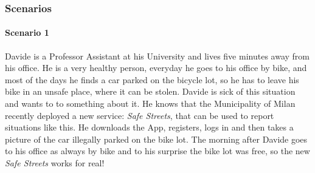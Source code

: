 \subsubsection{Scenarios}


\paragraph{Scenario 1}
Davide is a Professor Assistant at his University and lives five minutes away
from his office. He is a very healthy person, everyday he goes to his office by
bike, and most of the days he finds a car parked on the bicycle lot, so he has
to leave his bike in an unsafe place, where it can be stolen. Davide is
sick of this situation and wants to to something about it. He knows that the
Municipality of Milan recently deployed a new service: \emph{Safe Streets}, that
can be used to report situations like this. He downloads the App, registers,
logs in and then takes a picture of the car illegally parked on the bike lot.
The morning after Davide goes to his office as always by bike and to his
surprise the bike lot was free, so the new \emph{Safe Streets} works for real!